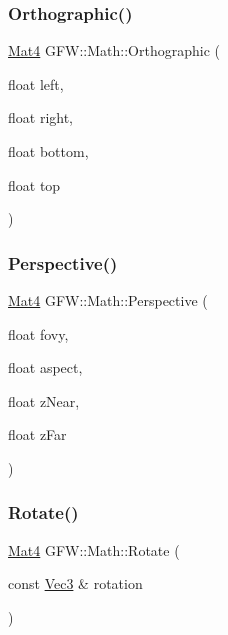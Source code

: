 \mbox{\label{namespace_g_f_w_1_1_math_a0dadedc2357d44473ec33b38d5457f00}} 
\subsubsection{\texorpdfstring{Orthographic()}{Orthographic()}}
{\footnotesize\ttfamily \hyperlink{namespace_g_f_w_1_1_math_a313d630ab7d0ef3b109bb39401962fb1}{Mat4} G\+F\+W\+::\+Math\+::\+Orthographic (\begin{DoxyParamCaption}\item[{float}]{left,  }\item[{float}]{right,  }\item[{float}]{bottom,  }\item[{float}]{top }\end{DoxyParamCaption})\hspace{0.3cm}{\ttfamily [inline]}}

\mbox{\label{namespace_g_f_w_1_1_math_acd834e439cef29d3b31dacd50120d201}} 
\subsubsection{\texorpdfstring{Perspective()}{Perspective()}}
{\footnotesize\ttfamily \hyperlink{namespace_g_f_w_1_1_math_a313d630ab7d0ef3b109bb39401962fb1}{Mat4} G\+F\+W\+::\+Math\+::\+Perspective (\begin{DoxyParamCaption}\item[{float}]{fovy,  }\item[{float}]{aspect,  }\item[{float}]{z\+Near,  }\item[{float}]{z\+Far }\end{DoxyParamCaption})\hspace{0.3cm}{\ttfamily [inline]}}

\mbox{\label{namespace_g_f_w_1_1_math_a346f4e2d64a4fcd1e6c755e68752fb97}} 
\subsubsection{\texorpdfstring{Rotate()}{Rotate()}\hspace{0.1cm}{\footnotesize\ttfamily [1/2]}}
{\footnotesize\ttfamily \hyperlink{namespace_g_f_w_1_1_math_a313d630ab7d0ef3b109bb39401962fb1}{Mat4} G\+F\+W\+::\+Math\+::\+Rotate (\begin{DoxyParamCaption}\item[{const \hyperlink{namespace_g_f_w_1_1_math_a3c3a254de27c8bbb8434611ce231c378}{Vec3} \&}]{rotation }\end{DoxyParamCaption})\hspace{0.3cm}{\ttfamily [inline]}}

